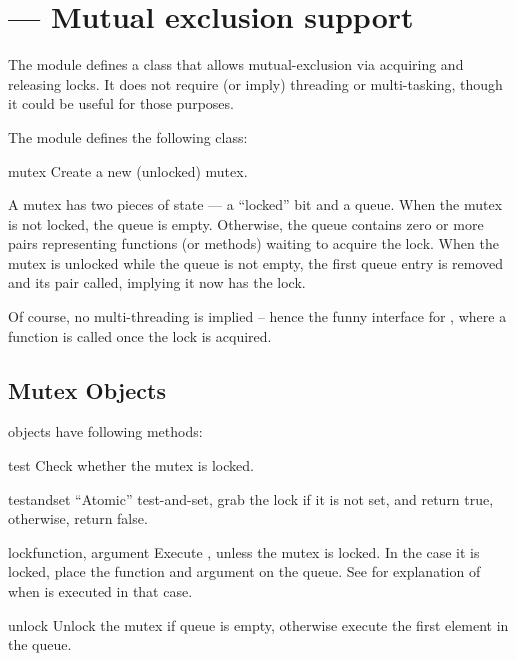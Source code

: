 \section{ ---
         Mutual exclusion support}


The  module defines a class that allows mutual-exclusion
via acquiring and releasing locks. It does not require (or imply)
threading or multi-tasking, though it could be useful for
those purposes.

The  module defines the following class:

\begin{classdesc}{mutex}{}
Create a new (unlocked) mutex.

A mutex has two pieces of state --- a ``locked'' bit and a queue.
When the mutex is not locked, the queue is empty.
Otherwise, the queue contains zero or more 
 pairs
representing functions (or methods) waiting to acquire the lock.
When the mutex is unlocked while the queue is not empty,
the first queue entry is removed and its 
 pair called,
implying it now has the lock.

Of course, no multi-threading is implied -- hence the funny interface
for , where a function is called once the lock is
acquired.
\end{classdesc}


\subsection{Mutex Objects \label{mutex-objects}}

 objects have following methods:

\begin{methoddesc}{test}{}
Check whether the mutex is locked.
\end{methoddesc}

\begin{methoddesc}{testandset}{}
``Atomic'' test-and-set, grab the lock if it is not set,
and return true, otherwise, return false.
\end{methoddesc}

\begin{methoddesc}{lock}{function, argument}
Execute , unless the mutex is locked.
In the case it is locked, place the function and argument on the queue.
See  for explanation of when
 is executed in that case.
\end{methoddesc}

\begin{methoddesc}{unlock}{}
Unlock the mutex if queue is empty, otherwise execute the first element
in the queue.
\end{methoddesc}

